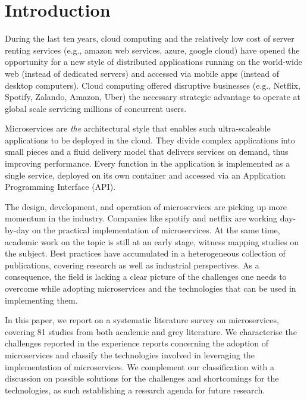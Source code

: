 
\section{Introduction}\label{sec:intro}

During the last ten years, cloud computing and the relatively low cost of server renting services (e.g., amazon web services, azure, google cloud) have opened the opportunity for a new style of distributed applications running on the world-wide web (instead of dedicated servers) and accessed via mobile apps (instead of desktop computers).
Cloud computing offered disruptive businesses (e.g., Netflix, Spotify, Zalando, Amazon, Uber) the necessary strategic advantage to operate at global scale servicing millions of concurrent users.

Microservices are \emph{the} architectural style that enables such ultra-scaleable applications to be deployed in the cloud.
They divide complex applications into small pieces and a fluid delivery model that delivers services on demand, thus improving performance.\cite{Larrucea2018}
Every function in the application is implemented as a single service, deployed on its own container and accessed via an Application Programming Interface (API).\cite{Danbettinger2019}

The design, development, and operation of microservices are picking up more momentum in the industry.
Companies like spotify and netflix are working day-by-day on the practical implementation of microservices.\cite{Kevin2015, Meshenberg2016}
At the same time, academic work on the topic is still at an early stage, witness mapping studies on the subject.\cite{Soldani2018, Dragoni2017, Olaf2016}
Best practices have accumulated in a heterogeneous collection of publications, covering research as well as industrial perspectives.
As a consequence, the field is lacking a clear picture of the challenges one needs to overcome while adopting microservices and the technologies that can be used in implementing them.

In this paper, we report on a systematic literature survey on microservices, covering 81 studies from both academic and grey literature. %
We characterise the challenges reported in the experience reports concerning the adoption of microservices and classify the technologies involved in leveraging the implementation of microservices.
We complement our classification with a discussion on possible solutions for the challenges and shortcomings for the technologies, as such establishing a research agenda for future research.


